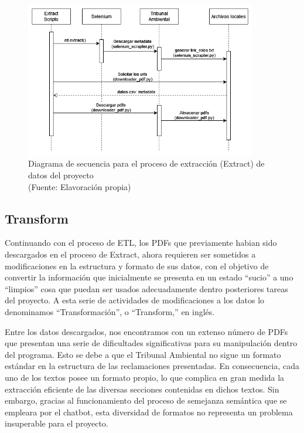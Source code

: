 \begin{figure}[ht!]
    \centering
    \includegraphics[width=0.9\textwidth]{figures/extract_diagram.png}
    \caption[Diagrama de secuencia para el proceso de extracción (Extract) de datos del proyecto]{Diagrama de secuencia para el proceso de extracción (Extract) de datos del proyecto\\
    {\scriptsize (Fuente: Elavoración propia)}}
    \label{fig:extract_diagram}
\end{figure}


\newpage

\subsection{Transform}

\par Continuando con el proceso de ETL, los PDFs que previamente habian sido descargados en el proceso de Extract,
ahora requieren ser sometidos a modificaciones en la estructura y formato de sus datos, con el objetivo de convertir la información que inicialmente se presenta en un 
estado ``sucio'' a uno  ``limpios'' cosa que puedan ser usados adecuadamente dentro posteriores tareas del proyecto. A esta serie de actividades de modificaciones a los datos lo denominamos
``Transformación'', o ``Transform,'' en inglés.

\par Entre los datos descargados, nos encontramos con un extenso número de PDFs que presentan una serie de dificultades significativas para su 
manipulación dentro del programa. Esto se debe a que el Tribunal Ambiental no sigue un formato estándar en la estructura de las reclamaciones 
presentadas. En consecuencia, cada uno de los textos posee un formato propio, lo que complica en gran medida la extracción 
eficiente de las diversas secciones contenidas en dichos textos. Sin embargo, gracias al funcionamiento del proceso de semejanza 
semántica que se empleara por el chatbot, esta diversidad de formatos no representa un problema insuperable para el proyecto.

